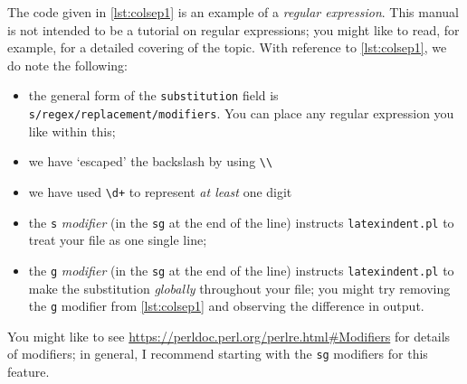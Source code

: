 \begin{example}
		The code given in \cref{lst:colsep1} is an example of a \emph{regular expression}.
		This manual is not intended to be
		a tutorial on regular expressions; you might like to read, for example, \cite{masteringregexp} for a detailed
		covering of the topic. With reference to \cref{lst:colsep1}, we do note the following:
		\begin{itemize}
			\item the general form of the \texttt{substitution} field is \lstinline!s/regex/replacement/modifiers!. You can
			      place any regular expression you like within this;
			\item we have `escaped' the backslash by using \lstinline!\\!
			\item we have used \lstinline!\d+! to represent \emph{at least} one digit
			\item the \texttt{s} \emph{modifier} (in the \texttt{sg} at the end of the line) instructs \texttt{latexindent.pl} to
			      treat your file as one single line;
			\item the \texttt{g} \emph{modifier} (in the \texttt{sg} at the end of the line) instructs \texttt{latexindent.pl} to
			      make the substitution \emph{globally} throughout your file; you might try removing
			      the \texttt{g} modifier from \cref{lst:colsep1} and observing the
			      difference in output.
		\end{itemize}
		You might like to see \href{https://perldoc.perl.org/perlre.html#Modifiers}{https://perldoc.perl.org/perlre.html\#Modifiers}
		for details of modifiers; in general, I recommend starting with the \texttt{sg} modifiers for this feature.
	\end{example}

